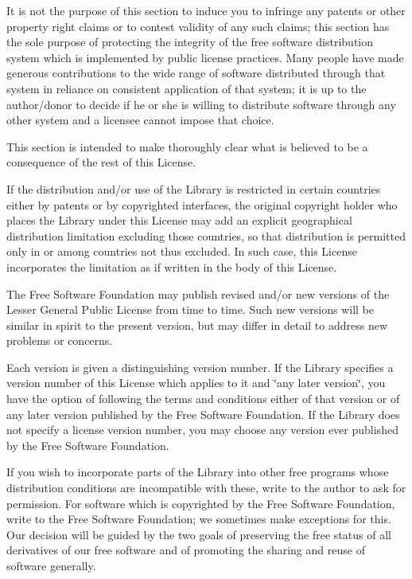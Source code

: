 It is not the purpose of this section to induce you to infringe any patents or other property right claims or to contest validity of any such claims; this section has the sole purpose of protecting the integrity of the free software distribution system which is implemented by public license practices. Many people have made generous contributions to the wide range of software distributed through that system in reliance on consistent application of that system; it is up to the author/donor to decide if he or she is willing to distribute software through any other system and a licensee cannot impose that choice.

This section is intended to make thoroughly clear what is believed to be a consequence of the rest of this License.


\begin{DoxyEnumerate}
\item If the distribution and/or use of the Library is restricted in certain countries either by patents or by copyrighted interfaces, the original copyright holder who places the Library under this License may add an explicit geographical distribution limitation excluding those countries, so that distribution is permitted only in or among countries not thus excluded. In such case, this License incorporates the limitation as if written in the body of this License.
\item The Free Software Foundation may publish revised and/or new versions of the Lesser General Public License from time to time. Such new versions will be similar in spirit to the present version, but may differ in detail to address new problems or concerns.
\end{DoxyEnumerate}

Each version is given a distinguishing version number. If the Library specifies a version number of this License which applies to it and \char`\"{}any later version\char`\"{}, you have the option of following the terms and conditions either of that version or of any later version published by the Free Software Foundation. If the Library does not specify a license version number, you may choose any version ever published by the Free Software Foundation.


\begin{DoxyEnumerate}
\item If you wish to incorporate parts of the Library into other free programs whose distribution conditions are incompatible with these, write to the author to ask for permission. For software which is copyrighted by the Free Software Foundation, write to the Free Software Foundation; we sometimes make exceptions for this. Our decision will be guided by the two goals of preserving the free status of all derivatives of our free software and of promoting the sharing and reuse of software generally.
\end{DoxyEnumerate}

